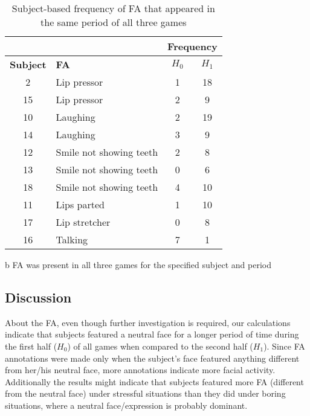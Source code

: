 \begin{table}[!h]
\renewcommand{\arraystretch}{1.3}
\caption{Subject-based frequency of FA that appeared in the same period of all three games}
\label{table:individual}
\centering
\begin{threeparttable}
\begin{tabular}{|c|p{4.8cm}|c|c|}
\cline{3-4}
\multicolumn{2}{c|}{} & \multicolumn{2}{|c|}{\textbf{Frequency}} \\
\hline
\textbf{Subject} & \textbf{FA} & \textbf{$H_0$} & \textbf{$H_1$} \\
\hline
2 & Lip pressor & 1 & 18\tnote{b} \\
\hline
15 & Lip pressor & 2 & 9\tnote{b} \\
\hline
10 & Laughing & 2 & 19\tnote{b} \\
\hline
14 & Laughing & 3 & 9\tnote{b} \\
\hline
12 & Smile not showing teeth & 2 & 8\tnote{b} \\
\hline
13 & Smile not showing teeth & 0 & 6\tnote{b} \\
\hline
18 & Smile not showing teeth & 4 & 10\tnote{b} \\
\hline
11 & Lips parted & 1 & 10\tnote{b} \\
\hline
17 & Lip stretcher & 0 & 8\tnote{b} \\
\hline
16 & Talking & 7\tnote{b} & 1 \\
\hline
\end{tabular}
\begin{tablenotes}
\small
\item[b]{FA was present in all three games for the specified subject and period}
\end{tablenotes}
\end{threeparttable}
\end{table}

\subsection{Discussion}

About the FA, even though further investigation is required, our calculations indicate that subjects featured a neutral face for a longer period of time during the first half ($H_0$) of all games when compared to the second half ($H_1$). Since FA annotations were made only when the subject's face featured anything different from her/his neutral face, more annotations indicate more facial activity. Additionally the results might indicate that subjects featured more FA (different from the neutral face) under stressful situations than they did under boring situations, where a neutral face/expression is probably dominant.


